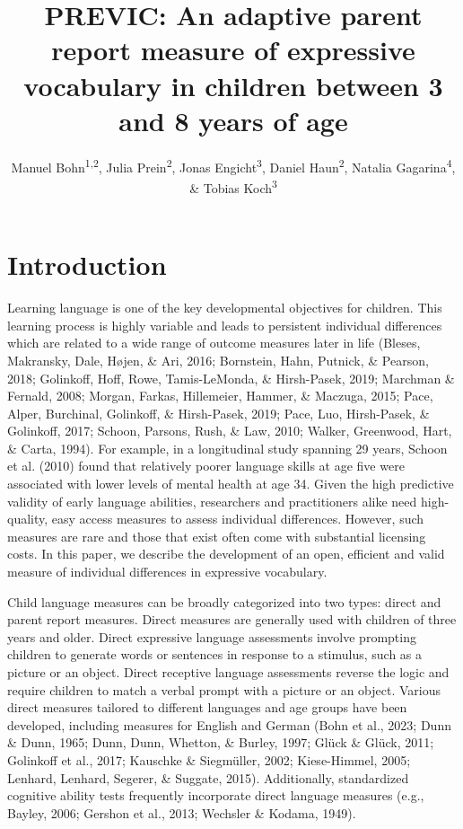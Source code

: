 \documentclass[
  man,floatsintext]{apa6}
\title{PREVIC: An adaptive parent report measure of expressive vocabulary in children between 3 and 8 years of age}
\author{Manuel Bohn\textsuperscript{1,2}, Julia Prein\textsuperscript{2}, Jonas Engicht\textsuperscript{3}, Daniel Haun\textsuperscript{2}, Natalia Gagarina\textsuperscript{4}, \& Tobias Koch\textsuperscript{3}}
\date{}
\affiliation{\vspace{0.5cm}\textsuperscript{1} Institute for Psychology, Leuphana University Lüneburg, Germany\\\textsuperscript{2} Department of Comparative Cultural Psychology, Max Planck Institute for Evolutionary Anthropology, Leipzig, Germany\\\textsuperscript{3} Institut of Psychology, Friedrich-Schiller-University Jena, Germany\\\textsuperscript{4} Leibniz-Zentrum Allgemeine Sprachwissenschaft, Berlin, Germany}
\begin{document}
\maketitle

\hypertarget{introduction}{%
\section{Introduction}\label{introduction}}

Learning language is one of the key developmental objectives for children. This learning process is highly variable and leads to persistent individual differences which are related to a wide range of outcome measures later in life (Bleses, Makransky, Dale, Højen, \& Ari, 2016; Bornstein, Hahn, Putnick, \& Pearson, 2018; Golinkoff, Hoff, Rowe, Tamis-LeMonda, \& Hirsh-Pasek, 2019; Marchman \& Fernald, 2008; Morgan, Farkas, Hillemeier, Hammer, \& Maczuga, 2015; Pace, Alper, Burchinal, Golinkoff, \& Hirsh-Pasek, 2019; Pace, Luo, Hirsh-Pasek, \& Golinkoff, 2017; Schoon, Parsons, Rush, \& Law, 2010; Walker, Greenwood, Hart, \& Carta, 1994). For example, in a longitudinal study spanning 29 years, Schoon et al. (2010) found that relatively poorer language skills at age five were associated with lower levels of mental health at age 34. Given the high predictive validity of early language abilities, researchers and practitioners alike need high-quality, easy access measures to assess individual differences. However, such measures are rare and those that exist often come with substantial licensing costs. In this paper, we describe the development of an open, efficient and valid measure of individual differences in expressive vocabulary.

Child language measures can be broadly categorized into two types: direct and parent report measures. Direct measures are generally used with children of three years and older. Direct expressive language assessments involve prompting children to generate words or sentences in response to a stimulus, such as a picture or an object. Direct receptive language assessments reverse the logic and require children to match a verbal prompt with a picture or an object. Various direct measures tailored to different languages and age groups have been developed, including measures for English and German (Bohn et al., 2023; Dunn \& Dunn, 1965; Dunn, Dunn, Whetton, \& Burley, 1997; Glück \& Glück, 2011; Golinkoff et al., 2017; Kauschke \& Siegmüller, 2002; Kiese-Himmel, 2005; Lenhard, Lenhard, Segerer, \& Suggate, 2015). Additionally, standardized cognitive ability tests frequently incorporate direct language measures (e.g., Bayley, 2006; Gershon et al., 2013; Wechsler \& Kodama, 1949).
\end{document}
